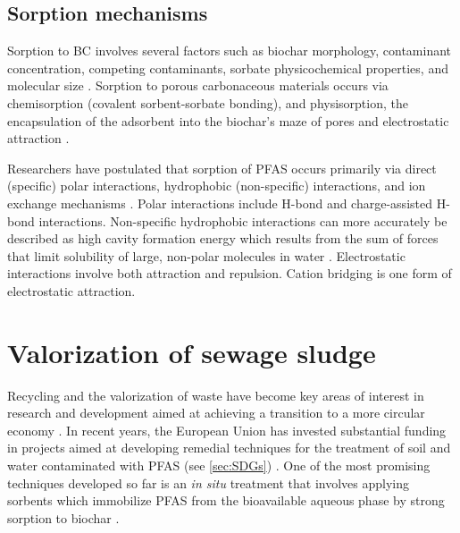 \subsection{Sorption mechanisms}\label{sec:mechanisms}
Sorption to \acrshort{BC} involves several factors such as biochar morphology, contaminant concentration, competing contaminants, sorbate physicochemical properties, and molecular size \citep{Li2019,du2014adsorption}. Sorption to porous carbonaceous materials occurs via chemisorption (covalent sorbent-sorbate bonding), and physisorption, the encapsulation of the adsorbent into the biochar's maze of pores and electrostatic attraction \citep{Li2019}. 

Researchers have postulated that sorption of PFAS occurs primarily via direct (specific) polar interactions, hydrophobic (non-specific) interactions, and ion exchange mechanisms \citep{Hale2017fire,yu2009sorption}. Polar interactions include H-bond and charge-assisted H-bond interactions. Non-specific hydrophobic interactions can more accurately be described as high cavity formation energy which results from the sum of forces that limit solubility of large, non-polar molecules in water \citep{Arp2006,sigmund2022sorption}. Electrostatic interactions involve both attraction and repulsion. Cation bridging is one form of electrostatic attraction.


\section{Valorization of sewage sludge}
Recycling and the valorization of waste have become key areas of interest in research and development aimed at achieving a transition to a more circular economy \citep{Ahmad2014}. In recent years, the European Union has invested substantial funding in projects aimed at developing remedial techniques for the treatment of soil and water contaminated with PFAS (see \cref{sec:SDGs}) \citep{EC2020PFAS,ECHA2020}. One of the most promising techniques developed so far is an \textit{in situ} treatment that involves applying sorbents which immobilize PFAS from the bioavailable aqueous phase by strong sorption to biochar \citep{Ahmad2014,Sormo2021,Kupryianchyk2016b}.

